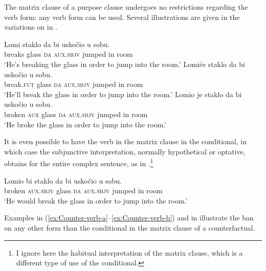 \documentclass[output=paper]{langscibook}
\begin{document}
\noindent The matrix clause of a purpose clause undergoes no restrictions regarding the verb form: any verb form can be used. Several illustrations are given in the variations on  in .

\ea\label{ex:Final-m-verb}
\ea \gll Lomi staklo da bi uskočio u sobu.\\
    breaks glass \textsc{da} \textsc{aux.sbjv} jumped in room\\
    \glt `He's breaking the glass in order to jump into the room.'\label{ex:Final-m-verb-a}
\ex \gll Lomiće staklo da bi uskočio u sobu.\\
    break.\textsc{fut} glass \textsc{da} \textsc{aux.sbjv} jumped in room\\
    \glt `He'll break the glass in order to jump into the room.'\label{ex:Final-m-verb-b}
\ex \gll Lomio je staklo da bi uskočio u sobu.\\
    broken \textsc{aux} glass \textsc{da} \textsc{aux.sbjv} jumped in room\\
    \glt `He broke the glass in order to jump into the room.'\label{ex:Final-m-verb-c}
\z\z

\noindent It is even possible to have the verb in the matrix clause in the conditional, in which case the subjunctive interpretation, normally hypothetical or optative, obtains for the entire complex sentence, as in .\footnote{I ignore here the habitual interpretation of the matrix clause, which is a different type of use of the conditional.}

\ea\label{ex:Final-subj-verb}
\gll Lomio bi staklo da bi uskočio u sobu.\\
    broken \textsc{aux.sbjv} glass \textsc{da} \textsc{aux.sbjv} jumped in room\\
    \glt `He would break the glass in order to jump into the room.'
\z

\noindent Examples in (\ref{ex:Counter-verb-a}--\ref{ex:Counter-verb-b}) and in  illustrate the ban on any other form than the conditional in the matrix clause of a counterfactual.

\ea\label{ex:Unreal-m-verb}
\label{ex:Unreal-m-verb-a}
\label{ex:Unreal-m-verb-b}
\z\z
\end{document}
